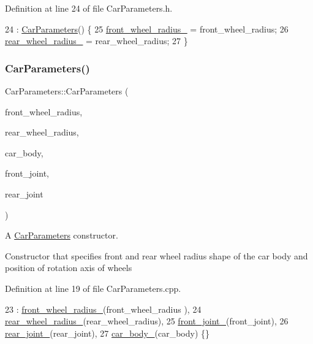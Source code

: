Definition at line 24 of file Car\+Parameters.\+h.


\begin{DoxyCode}
24                                                                        : 
      \hyperlink{classCarParameters_a188ab05105e5d379744f2fec14d51650}{CarParameters}() \{
25         \hyperlink{classCarParameters_ab66832af7618ebe04364630c92850096}{front\_wheel\_radius\_} = front\_wheel\_radius;
26         \hyperlink{classCarParameters_a6d3c3fc1c4eef292a7f536da2a089bbd}{rear\_wheel\_radius\_} = rear\_wheel\_radius;
27     \}
\end{DoxyCode}
\mbox{\label{classCarParameters_ae6c1ad622bffec4176ef45456e8aaacc}} 
\subsubsection{\texorpdfstring{Car\+Parameters()}{CarParameters()}\hspace{0.1cm}{\footnotesize\ttfamily [3/3]}}
{\footnotesize\ttfamily Car\+Parameters\+::\+Car\+Parameters (\begin{DoxyParamCaption}\item[{double}]{front\+\_\+wheel\+\_\+radius,  }\item[{double}]{rear\+\_\+wheel\+\_\+radius,  }\item[{const std\+::vector$<$ b2\+Vec2 $>$ \&}]{car\+\_\+body,  }\item[{b2\+Vec2}]{front\+\_\+joint,  }\item[{b2\+Vec2}]{rear\+\_\+joint }\end{DoxyParamCaption})}



A \hyperlink{classCarParameters}{Car\+Parameters} constructor. 

Constructor that specifies front and rear wheel radius shape of the car body and position of rotation axis of wheels 

Definition at line 19 of file Car\+Parameters.\+cpp.


\begin{DoxyCode}
23                                                 : \hyperlink{classCarParameters_ab66832af7618ebe04364630c92850096}{front\_wheel\_radius\_}(front\_wheel\_radius
      ),
24                                                   \hyperlink{classCarParameters_a6d3c3fc1c4eef292a7f536da2a089bbd}{rear\_wheel\_radius\_}(rear\_wheel\_radius),
25                                                   \hyperlink{classCarParameters_a471bcf264de846ca28e52bde8780f6a8}{front\_joint\_}(front\_joint),
26                                                   \hyperlink{classCarParameters_aec19cf9d1c6ab5f00ac5ff166ee0015a}{rear\_joint\_}(rear\_joint),
27                                                   \hyperlink{classCarParameters_a304345d7fd7771c87421e87785bce810}{car\_body\_}(car\_body) \{\}
\end{DoxyCode}


